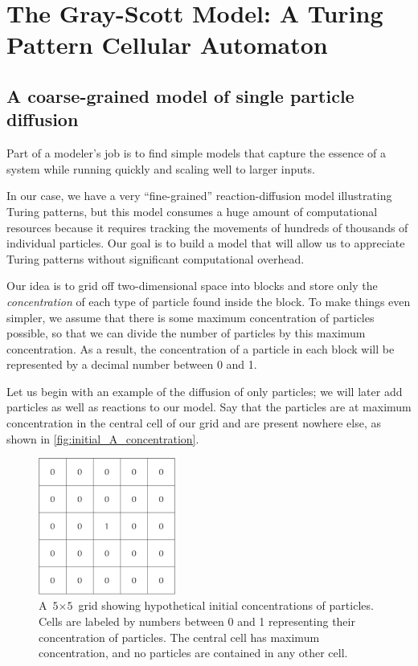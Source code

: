 \FloatBarrier
{}

\section{The Gray-Scott Model: A Turing Pattern Cellular Automaton}
\label{sec:the_gray-scott_model:_a_turing_pattern_cellular_automaton}

\subsection{A coarse-grained model of single particle diffusion}

Part of a modeler's job is to find simple models that capture the essence of a system while running quickly and scaling well to larger inputs.

In our case, we have a very ``fine-grained'' reaction-diffusion model illustrating Turing patterns, but this model consumes a huge amount of computational resources because it requires tracking the movements of hundreds of thousands of individual particles. Our goal is to build a model that will allow us to appreciate Turing patterns without significant computational overhead.

Our idea is to grid off two-dimensional space into blocks and store only the \textit{concentration} of each type of particle found inside the block. To make things even simpler, we assume that there is some maximum concentration of particles possible, so that we can divide the number of particles by this maximum concentration. As a result, the concentration of a particle in each block will be represented by a decimal number between 0 and 1.

Let us begin with an example of the diffusion of only  particles; we will later add  particles as well as reactions to our model. Say that the particles are at maximum concentration in the central cell of our grid and are present nowhere else, as shown in \autoref{fig:initial_A_concentration}.\\

\begin{figure}[h]
\centering
\mySfFamily
\includegraphics[width = 0.4\textwidth]{../images/initial_A_concentration.png}
\caption{A $\text{5} \times \text{5}$ grid showing hypothetical initial concentrations of  particles. Cells are labeled by numbers between 0 and 1 representing their concentration of  particles. The central cell has maximum concentration, and no particles are contained in any other cell.}
\label{fig:initial_A_concentration}
\end{figure}

